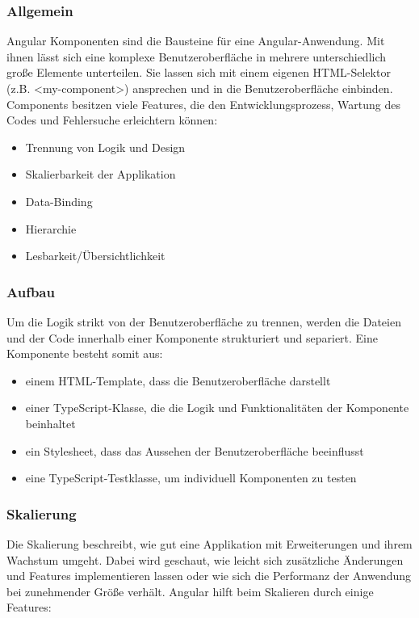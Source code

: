 \subsubsection{Allgemein}
Angular Komponenten sind die Bausteine für eine Angular-Anwendung. Mit ihnen lässt sich eine komplexe Benutzeroberfläche in mehrere unterschiedlich große Elemente unterteilen. Sie lassen sich mit einem eigenen HTML-Selektor (z.B. <my-component>) ansprechen und in die Benutzeroberfläche einbinden. Components besitzen viele Features, die den Entwicklungsprozess, Wartung des Codes und Fehlersuche erleichtern können:

\begin{itemize}
    \item Trennung von Logik und Design
    \item Skalierbarkeit der Applikation
    \item Data-Binding
    \item Hierarchie
    \item Lesbarkeit/Übersichtlichkeit
\end{itemize}

\subsubsection{Aufbau}
Um die Logik strikt von der Benutzeroberfläche zu trennen, werden die Dateien und der Code innerhalb einer Komponente strukturiert und separiert. Eine Komponente besteht somit aus: 

\begin{itemize}
    \item einem HTML-Template, dass die Benutzeroberfläche darstellt
    \item einer TypeScript-Klasse, die die Logik und Funktionalitäten der Komponente beinhaltet
    \item ein Stylesheet, dass das Aussehen der Benutzeroberfläche beeinflusst
    \item eine TypeScript-Testklasse, um individuell Komponenten zu testen 
\end{itemize}

\cite{AngularComponentOverview}

\subsubsection{Skalierung}
Die Skalierung beschreibt, wie gut eine Applikation mit Erweiterungen und ihrem Wachstum umgeht. Dabei wird geschaut, wie leicht sich zusätzliche Änderungen und Features implementieren lassen oder wie sich die Performanz der Anwendung bei zunehmender Größe verhält. Angular hilft beim Skalieren durch einige Features:

